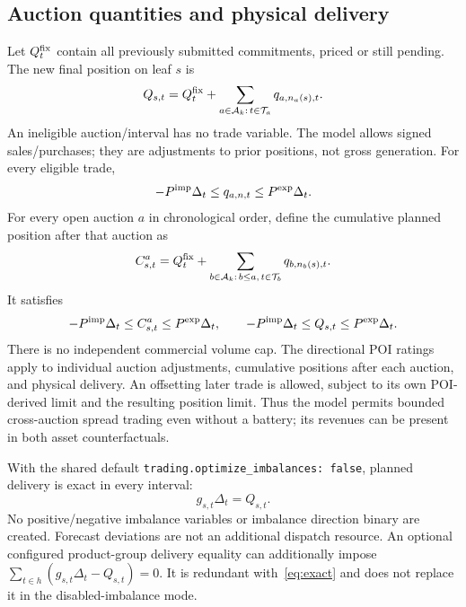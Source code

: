\documentclass[11pt,a4paper]{article}
\begin{document}
\subsection{Auction quantities and physical delivery}
Let $Q^{\rm fix}_t$ contain all previously submitted commitments, priced or still
pending. The new final position on leaf $s$ is
\begin{equation}\label{eq:position}
 Q_{s,t}=Q^{\rm fix}_t+
       \sum_{a\in\mathcal A_k:\,t\in\mathcal T_a}q_{a,n_a(s),t}.
\end{equation}
An ineligible auction/interval has no trade variable. The model allows signed
sales/purchases; they are adjustments to prior positions, not gross generation.
For every eligible trade,
\begin{equation}\label{eq:tradepoi}
 -P^{\rm imp}\Delta_t\le q_{a,n,t}\le P^{\rm exp}\Delta_t.
\end{equation}
For every open auction $a$ in chronological order, define the cumulative planned
position after that auction as
\begin{equation}
 C^a_{s,t}=Q^{\rm fix}_t+
 \sum_{b\in\mathcal A_k:\,b\le a,\,t\in\mathcal T_b}q_{b,n_b(s),t}.
\end{equation}
It satisfies
\begin{equation}\label{eq:cumulative}
 -P^{\rm imp}\Delta_t\le C^a_{s,t}\le P^{\rm exp}\Delta_t,
 \qquad -P^{\rm imp}\Delta_t\le Q_{s,t}\le P^{\rm exp}\Delta_t.
\end{equation}
There is no independent commercial volume cap. The directional POI ratings apply
to individual auction adjustments, cumulative positions after each auction, and
physical delivery. An offsetting later trade is allowed, subject to its own
POI-derived limit and the resulting position limit. Thus the model permits
bounded cross-auction spread trading even without a battery; its revenues can be
present in both asset counterfactuals.

With the shared default \texttt{trading.optimize\_imbalances: false}, planned
delivery is exact in every interval:
\begin{equation}\label{eq:exact}
 g_{s,t}\Delta_t=Q_{s,t}.
\end{equation}
No positive/negative imbalance variables or imbalance direction binary are
created. Forecast deviations are not an additional dispatch resource.
An optional configured product-group delivery equality can additionally impose
$\sum_{t\in h}(g_{s,t}\Delta_t-Q_{s,t})=0$. It is redundant with~\eqref{eq:exact}
and does not replace it in the disabled-imbalance mode.
\end{document}

